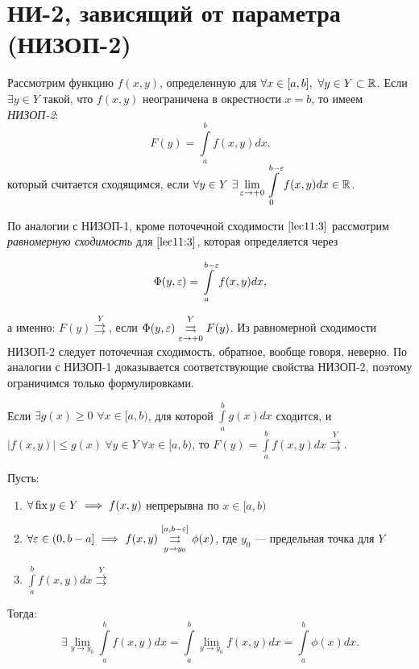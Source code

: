 \documentclass[../../main.tex]{subfiles}
\begin{document}
\section{НИ-2, зависящий от параметра (НИЗОП-2)}

	Рассмотрим функцию $f(x, y)$, определенную для $\forall x \in [a, b],\ 
	\forall 
	y \in Y \subset \R$. Если ${\exists y \in Y}$ такой, что $f(x, y)$ 
	неограничена в 
	окрестности $x = b$, то имеем \emph{НИЗОП-2}:
	\begin{equation}\label{lec11:3}
		F(y) = \int\limits_a^b f(x, y) dx.
	\end{equation}
	который считается сходящимся, если $\forall y \in Y\ \displaystyle \exists 
	\lim_{\varepsilon \rightarrow 
	+0} \int\limits_0^{b - \varepsilon} f(x, y) dx \in \mathbb{R}$.
	
	По аналогии с НИЗОП-1, кроме поточечной сходимости $\eqref{lec11:3}$ 
	рассмотрим \emph{равномерную сходимость} для $\eqref{lec11:3}$, которая 
	определяется 
	через 
	
	\begin{equation}\label{lec11:4}
		\Phi(y, \varepsilon) = \int\limits_a^{b - \varepsilon} f(x, y) dx,
	\end{equation}
	
	а именно: $F(y) \overset{Y}\rightrightarrows$, если $\Phi(y, \varepsilon) 
	\overset{Y}{\underset{\varepsilon \rightarrow +0}\rightrightarrows} F(y)$. Из 
	равномерной сходимости НИЗОП-2 следует поточечная сходимость, обратное, 
	вообще говоря, неверно. По аналогии с НИЗОП-1 доказывается соответствующие 
	свойства НИЗОП-2, поэтому ограничимся только формулировками.
	
	\begin{thm}
		Если $\exists {g(x) \geq 0}$ $\forall x \in [a, b)$, для которой
		$\int\limits_a^b g(x) dx$ сходится, и 
		$|f(x, y)| \leq g(x)\ \forall y \in Y\ \forall x \in [a, b)$,
		то $F(y) = \int\limits_a^b f(x, y) dx \overset{Y}{\rightrightarrows}$.
	\end{thm}
	
	\begin{thm}
		Пусть:
		
		\begin{enumerate}
			\item $\forall \operatorname{fix} y \in Y \implies f(x, y)$ непрерывна по $x \in [a, 
			b)$
			\item $\forall \varepsilon \in (0, b - a] \implies f(x, y) \overset{[a, b - 
			\varepsilon]}{\underset{y \rightarrow y_0}\rightrightarrows} \phi(x)$, где $y_0$ 
			--- предельная точка для $Y$
			\item $\int\limits_a^b f(x, y) dx \overset{Y}\rightrightarrows$
		\end{enumerate}
		
		Тогда:		
		\begin{equation}\label{lec11:5}
			\exists \lim_{y \rightarrow y_0} \int\limits_a^b f(x, y) dx = 
			\int\limits_a^b \lim_{y \rightarrow y_0} f(x, y) dx = \int\limits_a^b 
			\phi(x) dx.
		\end{equation}
	\end{thm}
\end{document}
